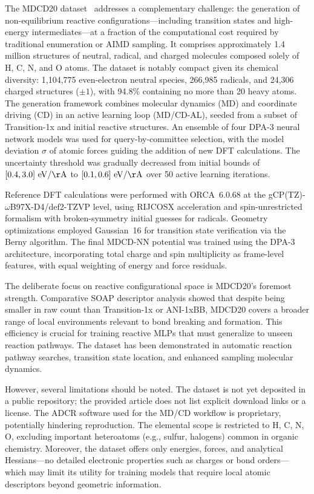 \documentclass[12pt]{article}
\begin{document}
The MDCD20 dataset~\cite{ds50-1,ds50-2,ds50-3} addresses a complementary challenge: the generation of non-equilibrium reactive configurations---including transition states and high-energy intermediates---at a fraction of the computational cost required by traditional enumeration or AIMD sampling. It comprises approximately 1.4 million structures of neutral, radical, and charged molecules composed solely of H, C, N, and O atoms. The dataset is notably compact given its chemical diversity: 1,104,775 even-electron neutral species, 266,985 radicals, and 24,306 charged structures ($\pm 1$), with 94.8\% containing no more than 20 heavy atoms. The generation framework combines molecular dynamics (MD) and coordinate driving (CD) in an active learning loop (MD/CD-AL), seeded from a subset of Transition-1x and initial reactive structures. An ensemble of four DPA-3 neural network models was used for query-by-committee selection, with the model deviation $\sigma$ of atomic forces guiding the addition of new DFT calculations. The uncertainty threshold was gradually decreased from initial bounds of $[0.4, 3.0]~\mathrm{eV/\AA}$ to $[0.1, 0.6]~\mathrm{eV/\AA}$ over 50 active learning iterations.

Reference DFT calculations were performed with ORCA~6.0.68 at the gCP(TZ)-$\omega$B97X-D4/def2-TZVP level, using RIJCOSX acceleration and spin-unrestricted formalism with broken-symmetry initial guesses for radicals. Geometry optimizations employed Gaussian~16 for transition state verification via the Berny algorithm. The final MDCD-NN potential was trained using the DPA-3 architecture, incorporating total charge and spin multiplicity as frame-level features, with equal weighting of energy and force residuals.

The deliberate focus on reactive configurational space is MDCD20's foremost strength. Comparative SOAP descriptor analysis showed that despite being smaller in raw count than Transition-1x or ANI-1xBB, MDCD20 covers a broader range of local environments relevant to bond breaking and formation. This efficiency is crucial for training reactive MLPs that must generalize to unseen reaction pathways. The dataset has been demonstrated in automatic reaction pathway searches, transition state location, and enhanced sampling molecular dynamics.

However, several limitations should be noted. The dataset is not yet deposited in a public repository; the provided article does not list explicit download links or a license. The ADCR software used for the MD/CD workflow is proprietary, potentially hindering reproduction. The elemental scope is restricted to H, C, N, O, excluding important heteroatoms (e.g., sulfur, halogens) common in organic chemistry. Moreover, the dataset offers only energies, forces, and analytical Hessians---no detailed electronic properties such as charges or bond orders---which may limit its utility for training models that require local atomic descriptors beyond geometric information.
\end{document}
